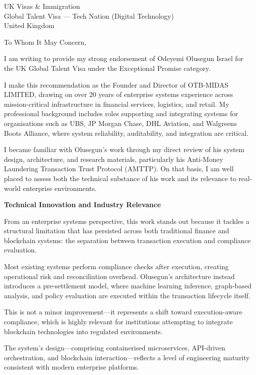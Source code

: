 \documentclass[12pt,a4paper]{letter}
\date{22 March 2026}
\begin{document}
\begin{letter}{UK Visas \& Immigration\\
Global Talent Visa --- Tech Nation (Digital Technology)\\
United Kingdom}

\opening{To Whom It May Concern,}

I am writing to provide my strong endorsement of Odeyemi Olusegun Israel for the UK Global Talent Visa under the Exceptional Promise category.

I make this recommendation as the Founder and Director of OTB-MIDAS LIMITED, drawing on over 20 years of enterprise systems experience across mission-critical infrastructure in financial services, logistics, and retail. My professional background includes roles supporting and integrating systems for organisations such as UBS, JP Morgan Chase, DHL Aviation, and Walgreens Boots Alliance, where system reliability, auditability, and integration are critical.

I became familiar with Olusegun's work through my direct review of his system design, architecture, and research materials, particularly his Anti-Money Laundering Transaction Trust Protocol (AMTTP). On that basis, I am well placed to assess both the technical substance of his work and its relevance to real-world enterprise environments.

\textbf{Technical Innovation and Industry Relevance}

From an enterprise systems perspective, this work stands out because it tackles a structural limitation that has persisted across both traditional finance and blockchain systems: the separation between transaction execution and compliance evaluation.

Most existing systems perform compliance checks after execution, creating operational risk and reconciliation overhead. Olusegun’s architecture instead introduces a pre-settlement model, where machine learning inference, graph-based analysis, and policy evaluation are executed within the transaction lifecycle itself.

This is not a minor improvement—it represents a shift toward execution-aware compliance, which is highly relevant for institutions attempting to integrate blockchain technologies into regulated environments.

The system’s design—comprising containerised microservices, API-driven orchestration, and blockchain interaction—reflects a level of engineering maturity consistent with modern enterprise platforms.


\end{letter}
\end{document}
